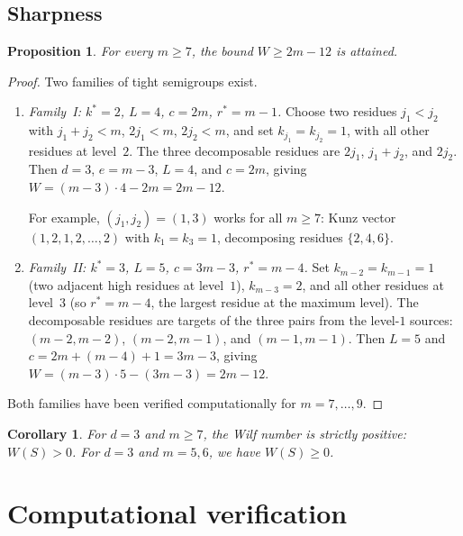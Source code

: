 \documentclass[11pt]{amsart}
\newtheorem{proposition}[theorem]{Proposition}
\newtheorem{corollary}[theorem]{Corollary}
\theoremstyle{definition}
\theoremstyle{remark}
\begin{document}
\subsection{Sharpness}

\begin{proposition}\label{prop:tight-C}
For every $m \ge 7$, the bound $W \ge 2m - 12$ is attained.
\end{proposition}

\begin{proof}
Two families of tight semigroups exist.

\begin{enumerate}[nosep]
  \item \emph{Family~I: $k^* = 2$, $L = 4$, $c = 2m$, $r^* = m - 1$.}
    Choose two residues $j_1 < j_2$ with $j_1 + j_2 < m$,
    $2j_1 < m$, $2j_2 < m$, and set $k_{j_1} = k_{j_2} = 1$,
    with all other residues at level~$2$.
    The three decomposable residues are $2j_1$, $j_1 + j_2$, and $2j_2$.
    Then $d = 3$, $e = m - 3$, $L = 4$, and $c = 2m$, giving
    $W = (m - 3) \cdot 4 - 2m = 2m - 12$.

    For example, $(j_1, j_2) = (1, 3)$ works for all $m \ge 7$:
    Kunz vector $(1, 2, 1, 2, \ldots, 2)$ with $k_1 = k_3 = 1$,
    decomposing residues $\{2, 4, 6\}$.

  \item \emph{Family~II: $k^* = 3$, $L = 5$, $c = 3m - 3$, $r^* = m - 4$.}
    Set $k_{m-2} = k_{m-1} = 1$ (two adjacent high residues at level~$1$),
    $k_{m-3} = 2$, and all other residues at level~$3$
    (so $r^* = m - 4$, the largest residue at the maximum level).
    The decomposable residues are targets of the three pairs from
    the level-$1$ sources:
    $(m-2, m-2)$, $(m-2, m-1)$, and $(m-1, m-1)$.
    Then $L = 5$ and $c = 2m + (m - 4) + 1 = 3m - 3$, giving
    $W = (m - 3) \cdot 5 - (3m - 3) = 2m - 12$.
\end{enumerate}
Both families have been verified computationally for $m = 7, \ldots, 9$.
\end{proof}

\begin{corollary}\label{cor:positive-d3}
For $d = 3$ and $m \ge 7$, the Wilf number is strictly positive: $W(S) > 0$.
For $d = 3$ and $m = 5, 6$, we have $W(S) \ge 0$.
\end{corollary}

\section{Computational verification}\label{sec:computation}
\end{document}
